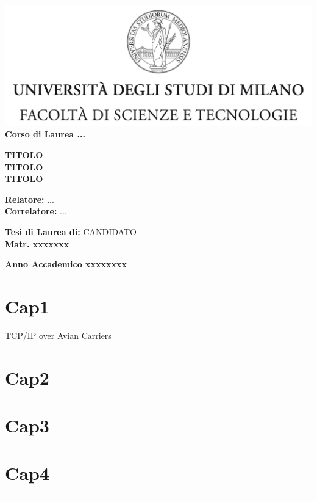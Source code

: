 \documentclass[12pt,a4paper]{report}
\begin{document}
\begin{titlepage}
\begin{center}
\includegraphics[width=\textwidth]{Logo.jpg}\\
{\large{\bf Corso di Laurea ...}}
\end{center}
\vspace{12mm}
\begin{center}
{\huge{\bf TITOLO}}\\
\vspace{4mm}
{\huge{\bf TITOLO}}\\
\vspace{4mm}
{\huge{\bf TITOLO}}\\
\end{center}
\vspace{12mm}
\begin{flushleft}
{\large{\bf Relatore:}}
{\large{...}}\\
\vspace{4mm}
{\large{\bf Correlatore:}}
{\large{...}}\\
\end{flushleft}
\vspace{12mm}
\begin{flushright}
{\large{\bf Tesi di Laurea di:}}
{\large{CANDIDATO}}\\
{\large{\bf Matr. xxxxxxx}}\\
\end{flushright}
\vspace{4mm}
\begin{center}
{\large{\bf Anno Accademico xxxxxxxx}}
\end{center}
\end{titlepage}


\tableofcontents


\chapter{Cap1}

TCP/IP over Avian Carriers\cite{waitzman1990standard}

\chapter{Cap2}
\chapter{Cap3}
\chapter{Cap4}




\hrule
%
\printbibliography[title={Bibliografia}]
\end{document}
